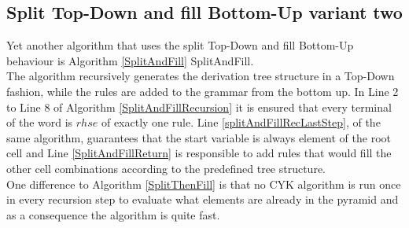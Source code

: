 \begin{testexample}
\begin{minipage}{6in}
{
			}
			
		\end{minipage}
		\label{IllustrationAlgorithmSplitThenFillPart6}
\end{testexample}

\clearpage

\subsection{Split Top-Down and fill Bottom-Up variant two}


\noindent Yet another algorithm that uses the split Top-Down and fill Bottom-Up behaviour is Algorithm \ref{SplitAndFill} SplitAndFill.\\
The algorithm recursively generates the derivation tree structure in a Top-Down fashion, while the rules are added to the grammar from the bottom up. In Line 2 to Line 8 of Algorithm \ref{SplitAndFillRecursion} it is ensured that every terminal of the word is $rhse$ of exactly one rule. Line \ref{splitAndFillRecLastStep}, of the same algorithm, guarantees that the start variable is always element of the root cell and Line \ref{SplitAndFillReturn} is responsible to add rules that would fill the other cell combinations according to the predefined tree structure. \\
One difference to Algorithm \ref{SplitThenFill} is that no CYK algorithm is run once in every recursion step to evaluate what elements are already in the pyramid and as a consequence the algorithm is quite fast. \\

